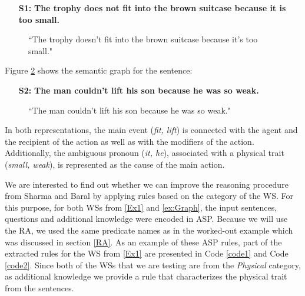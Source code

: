 \begin{itemize}
	\item[\textbf{S1:}] \textbf{The trophy does not fit into the brown suitcase because it is too small.}
\end{itemize}
\begin{figure} [h!]
	\centering
	
	\caption{\label{Graph1}``The trophy doesn't fit into the brown suitcase because it's too small."}
\end{figure}

Figure \ref{Graph2} shows the semantic graph for the sentence:

\begin{itemize}
	\item[\textbf{S2:}] \textbf{The man couldn't lift his son because he was so weak.}
\end{itemize} 


\begin{figure}[h!]
	\centering
	
	\caption{\label{Graph2}``The man couldn't lift his son because he was so weak."}
\end{figure}

In both representations, the main event (\textit{fit, lift}) is connected with the agent and the recipient of the action as well as with the modifiers of the action. Additionally, the ambiguous pronoun (\textit{it, he}),  associated with a physical trait (\textit{small, weak}), is represented as the cause of the main action. 

We are interested to find out whether we can improve the reasoning procedure from Sharma and Baral \cite{2018CommonsenseKT} 
by applying rules based on the category of the WS. 
For this purpose, for both WSs from  \ref{Ex1} and \ref{ex:Graph}, the input sentences, questions and additional knowledge were encoded in ASP. Because we will use the RA, we used the same predicate names as in the worked-out example which was discussed in section \ref{RA}. As an example of these ASP rules, part of the extracted rules for the WS from \ref{Ex1} are presented in Code \ref{code1} and  Code \ref{code2}. 
Since both of the WSs that we are testing are from the \textit{Physical} category, as additional knowledge we provide a rule that characterizes the physical trait from the sentences. 


